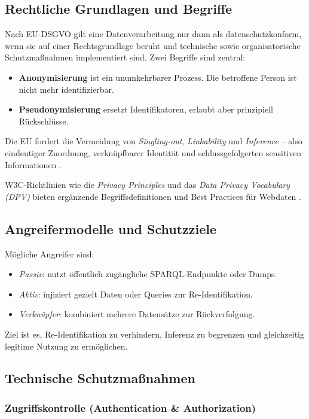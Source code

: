 \subsection{Rechtliche Grundlagen und Begriffe}

Nach EU-DSGVO gilt eine Datenverarbeitung nur dann als datenschutzkonform, wenn sie auf einer Rechtsgrundlage beruht und technische sowie organisatorische Schutzmaßnahmen implementiert sind. Zwei Begriffe sind zentral:
\begin{itemize}
\item \textbf{Anonymisierung} ist ein unumkehrbarer Prozess. Die betroffene Person ist nicht mehr identifizierbar.
\item \textbf{Pseudonymisierung} ersetzt Identifikatoren, erlaubt aber prinzipiell Rückschlüsse.
\end{itemize}
Die EU fordert die Vermeidung von \emph{Singling-out}, \emph{Linkability} und \emph{Inference} – also eindeutiger Zuordnung, verknüpfbarer Identität und schlussgefolgerten sensitiven Informationen \cite{Art29WPAnonymisation, enisa2019pseudonymisation}.

W3C-Richtlinien wie die \emph{Privacy Principles} und das \emph{Data Privacy Vocabulary (DPV)} bieten ergänzende Begriffsdefinitionen und Best Practices für Webdaten \cite{W3CPrivacyPrinciples, W3CDPV, W3CDWBP}.

\subsection{Angreifermodelle und Schutzziele}

Mögliche Angreifer sind:
\begin{itemize}
\item \emph{Passiv}: nutzt öffentlich zugängliche SPARQL-Endpunkte oder Dumps.
\item \emph{Aktiv}: injiziert gezielt Daten oder Queries zur Re-Identifikation.
\item \emph{Verknüpfer}: kombiniert mehrere Datensätze zur Rückverfolgung.
\end{itemize}
Ziel ist es, Re-Identifikation zu verhindern, Inferenz zu begrenzen und gleichzeitig legitime Nutzung zu ermöglichen.

\subsection{Technische Schutzmaßnahmen}

\subsubsection{Zugriffskontrolle (Authentication \& Authorization)}

